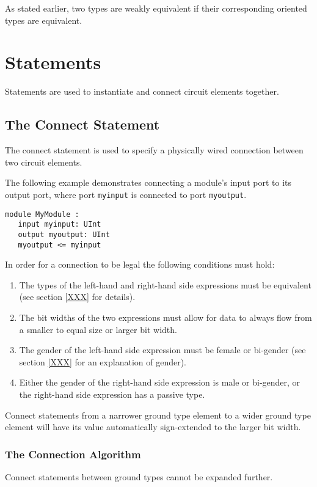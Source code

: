 \documentclass[12pt]{article}
\begin{document}
As stated earlier, two types are weakly equivalent if their corresponding oriented types are equivalent.


\section{Statements} \label{statements}

Statements are used to instantiate and connect circuit elements together.

\subsection{The Connect Statement}
The connect statement is used to specify a physically wired connection between two circuit elements.

The following example demonstrates connecting a module's input port to its output port, where port \verb|myinput| is connected to port \verb|myoutput|.
\begin{verbatim}
module MyModule :
   input myinput: UInt
   output myoutput: UInt
   myoutput <= myinput
\end{verbatim}

In order for a connection to be legal the following conditions must hold:
\begin{enumerate}
\item The types of the left-hand and right-hand side expressions must be equivalent (see section \ref{XXX} for details).
\item The bit widths of the two expressions must allow for data to always flow from a smaller to equal size or larger bit width.
\item The gender of the left-hand side expression must be female or bi-gender (see section \ref{XXX} for an explanation of gender).
\item Either the gender of the right-hand side expression is male or bi-gender, or the right-hand side expression has a passive type.
\end{enumerate}

Connect statements from a narrower ground type element to a wider ground type element will have its value automatically sign-extended to the larger bit width. 

\subsubsection{The Connection Algorithm}
Connect statements between ground types cannot be expanded further. 
\end{document}
